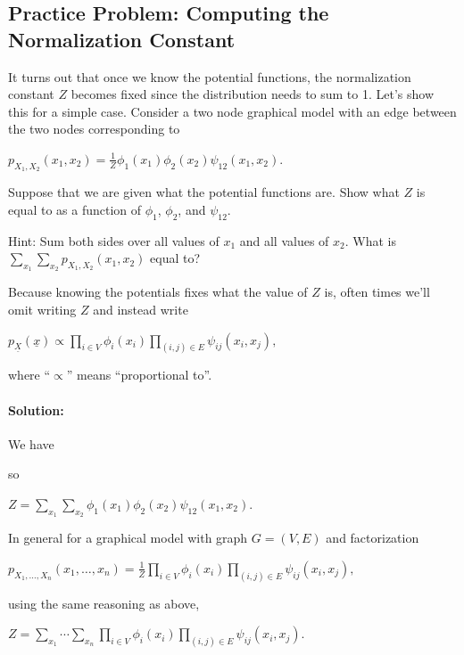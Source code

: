 \documentclass[6008notes.tex]{subfiles}
\begin{document}
\subsection{Practice Problem: Computing the Normalization Constant }

It turns out that once we know the potential functions, the normalization constant $Z$ becomes fixed since the distribution needs to sum to 1. Let's show this for a simple case. Consider a two node graphical model with an edge between the two nodes corresponding to

{\centering$p_{X_{1},X_{2}}(x_{1},x_{2})=\frac{1}{Z}\phi _{1}(x_{1})\phi _{2}(x_{2})\psi _{12}(x_{1},x_{2}).$ \par}
 
Suppose that we are given what the potential functions are. Show what $Z$ is equal to as a function of $\phi_{1}$, $\phi_{2}$, and $\psi_{12}$.

Hint: Sum both sides over all values of $x_1$ and all values of $x_2$. What is $\sum _{x_{1}}\sum _{x_{2}}p_{X_{1},X_{2}}(x_{1},x_{2})$ equal to?

Because knowing the potentials fixes what the value of $Z$ is, often times we'll omit writing $Z$ and instead write

{\centering$p_{\underline{X}}(\underline{x})\propto \prod _{i\in V}\phi _{i}(x_{i})\prod _{(i,j)\in E}\psi _{ij}(x_{i},x_{j}),$ \par}
 
where ``$\propto$'' means ``proportional to''.

\paragraph{Solution:} We have

{ \par}

so

{\centering$Z=\sum _{x_{1}}\sum _{x_{2}}\phi _{1}(x_{1})\phi _{2}(x_{2})\psi _{12}(x_{1},x_{2}).$ \par}
 
In general for a graphical model with graph $G=(V,E)$ and factorization

{\centering$p_{X_{1},\dots ,X_{n}}(x_{1},\dots ,x_{n})=\frac{1}{Z}\prod _{i\in V}\phi _{i}(x_{i})\prod _{(i,j)\in E}\psi _{ij}(x_{i},x_{j}),$ \par}
 
using the same reasoning as above,

{\centering$Z=\sum _{x_{1}}\cdots \sum _{x_{n}}\prod _{i\in V}\phi _{i}(x_{i})\prod _{(i,j)\in E}\psi _{ij}(x_{i},x_{j}).$ \par}
 
\end{document}
